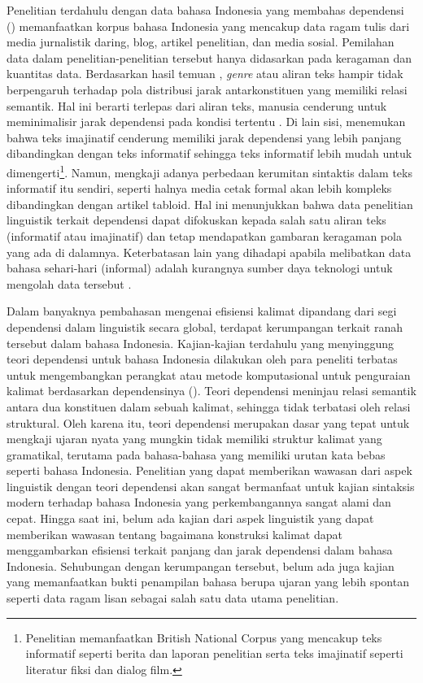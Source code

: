 Penelitian terdahulu dengan data bahasa Indonesia yang membahas dependensi (\citealp{kamayani2011dependency, green2012indonesian, irmawati2015dependency, futrell2015large}) memanfaatkan korpus bahasa Indonesia yang mencakup data ragam tulis dari media jurnalistik daring, blog, artikel penelitian, dan media sosial. Pemilahan data dalam penelitian-penelitian tersebut hanya didasarkan pada keragaman dan kuantitas data. Berdasarkan hasil temuan \cite{wang2017effects}, \textit{genre} atau aliran teks hampir tidak berpengaruh terhadap pola distribusi jarak antarkonstituen yang memiliki relasi semantik. Hal ini berarti terlepas dari aliran teks, manusia cenderung untuk meminimalisir jarak dependensi pada kondisi tertentu \citep{wang2017effects}. Di lain sisi, \citep{wang2017effects} menemukan bahwa teks imajinatif cenderung memiliki jarak dependensi yang lebih panjang dibandingkan dengan teks informatif sehingga teks informatif lebih mudah untuk dimengerti\footnote{Penelitian \cite{wang2017effects} memanfaatkan British National Corpus yang mencakup teks informatif seperti berita dan laporan penelitian serta teks imajinatif seperti literatur fiksi dan dialog film.}. Namun, \cite{miller2011critical} mengkaji adanya perbedaan kerumitan sintaktis dalam teks informatif itu sendiri, seperti halnya media cetak formal akan lebih kompleks dibandingkan dengan artikel tabloid. Hal ini menunjukkan bahwa data penelitian linguistik terkait dependensi dapat difokuskan kepada salah satu aliran teks (informatif atau imajinatif) dan tetap mendapatkan gambaran keragaman pola yang ada di dalamnya. Keterbatasan lain yang dihadapi apabila melibatkan data bahasa sehari-hari (informal) adalah kurangnya sumber daya teknologi untuk mengolah data tersebut \citep{green2012indonesian}. 

Dalam banyaknya pembahasan mengenai efisiensi kalimat dipandang dari segi dependensi dalam linguistik secara global, terdapat kerumpangan terkait ranah tersebut dalam bahasa Indonesia. Kajian-kajian terdahulu yang menyinggung teori dependensi untuk bahasa Indonesia dilakukan oleh para peneliti terbatas untuk mengembangkan perangkat atau metode komputasional untuk penguraian kalimat berdasarkan dependensinya (\citealp{kamayani2011dependency, green2012indonesian, irmawati2015dependency}). Teori dependensi meninjau relasi semantik antara dua konstituen dalam sebuah kalimat, sehingga tidak terbatasi oleh relasi struktural. Oleh karena itu, teori dependensi merupakan dasar yang tepat untuk mengkaji ujaran nyata yang mungkin tidak memiliki struktur kalimat yang gramatikal, terutama pada bahasa-bahasa yang memiliki urutan kata bebas seperti bahasa Indonesia. Penelitian yang dapat memberikan wawasan dari aspek linguistik dengan teori dependensi akan sangat bermanfaat untuk kajian sintaksis modern terhadap bahasa Indonesia yang perkembangannya sangat alami dan cepat. Hingga saat ini, belum ada kajian dari aspek linguistik yang dapat memberikan wawasan tentang bagaimana konstruksi kalimat dapat menggambarkan efisiensi terkait panjang dan jarak dependensi dalam bahasa Indonesia. Sehubungan dengan kerumpangan tersebut, belum ada juga kajian yang memanfaatkan bukti penampilan bahasa berupa ujaran yang lebih spontan seperti data ragam lisan sebagai salah satu data utama penelitian. 

